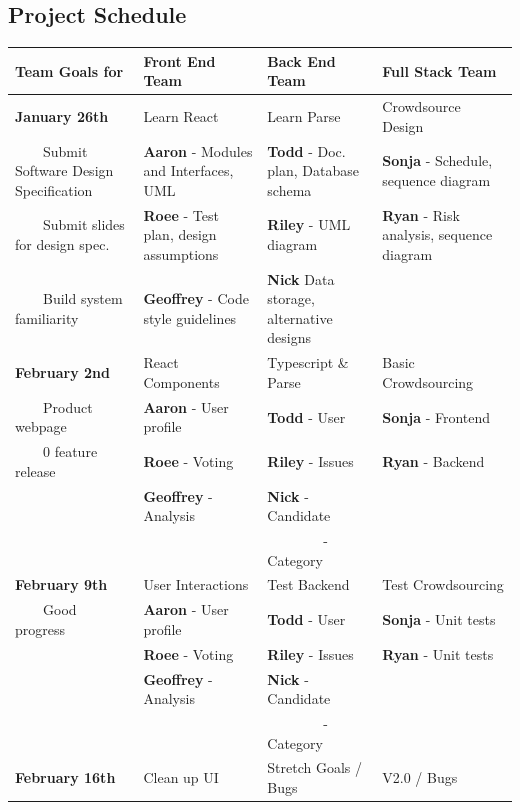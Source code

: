 \documentclass[11pt]{article}
\begin{document}
\subsection{Project Schedule}
\newcommand{\tabitem}{~~\llap{\textbullet}~~}
\begin{tabular}[t]{|L{1.45in}|L{1.45in}|L{1.45in}|L{1.45in}|}
    \hline
    \textbf{Team Goals for} & \textbf{Front End Team} & \textbf{Back End Team} & \textbf{Full Stack Team}\\
    \hline
    \textbf{January 26th} & Learn React & Learn Parse & Crowdsource Design\\
    \tabitem Submit Software Design Specification & \textbf{Aaron} - Modules and Interfaces, UML & \textbf{Todd} - Doc. plan, Database schema & \textbf{Sonja} - Schedule, sequence diagram\\
    \tabitem Submit slides for design spec. & \textbf{Roee} - Test plan, design assumptions & \textbf{Riley} - UML diagram & \textbf{Ryan} - Risk analysis, sequence diagram\\
    \tabitem Build system familiarity & \textbf{Geoffrey} - Code style guidelines & \textbf{Nick} Data storage, alternative designs & \\
    \hline
    \textbf{February 2nd} & React Components & Typescript \& Parse & Basic Crowdsourcing\\
    \tabitem Product webpage & \textbf{Aaron} - User profile & \textbf{Todd} - User & \textbf{Sonja} - Frontend\\
    \tabitem 0 feature release & \textbf{Roee} - Voting & \textbf{Riley} - Issues & \textbf{Ryan} - Backend\\
    & \textbf{Geoffrey} - Analysis & \textbf{Nick} - Candidate & \\
    & &\ \ \ \ \ \ \ \ - Category & \\
    \hline
    \textbf{February 9th} & User Interactions & Test Backend & Test Crowdsourcing\\
    \tabitem Good progress & \textbf{Aaron} - User profile & \textbf{Todd} - User & \textbf{Sonja} - Unit tests\\
    & \textbf{Roee} - Voting & \textbf{Riley} - Issues & \textbf{Ryan} - Unit tests\\
    & \textbf{Geoffrey} - Analysis & \textbf{Nick} - Candidate & \\
    & &\ \ \ \ \ \ \ \ - Category & \\
    \hline
    \textbf{February 16th} & Clean up UI & Stretch Goals / Bugs & V2.0 / Bugs\\

\end{tabular}
\end{document}
